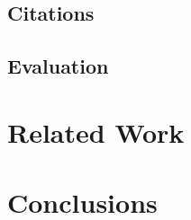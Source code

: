 \documentclass{acm_proc_article-sp}
\begin{document}
\subsection{Citations}

\subsection{Evaluation}

\section{Related Work}

\section{Conclusions}


\end{document}
